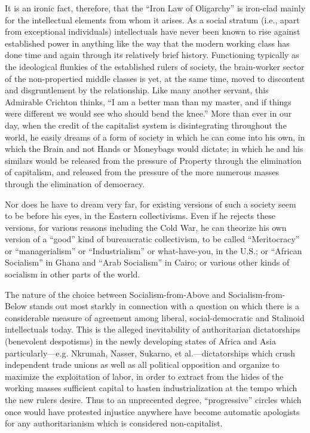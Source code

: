 It is an ironic fact, therefore, that the ``Iron Law of Oligarchy'' is iron-clad mainly for the intellectual elements from whom it arises. As a social stratum (i.e., apart from exceptional individuals) intellectuals have never been known to rise against established power in anything like the way that the modern working class has done time and again through its relatively brief history. Functioning typically as the ideological flunkies of the established rulers of society, the brain-worker sector of the non-propertied middle classes is yet, at the same time, moved to discontent and disgruntlement by the relationship. Like many another servant, this Admirable Crichton thinks, ``I am a better man than my master, and if things were different we would see who should bend the knee.'' More than ever in our day, when the credit of the capitalist system is disintegrating throughout the world, he easily dreams of a form of society in which he can come into his own, in which the Brain and not Hands or Moneybags would dictate; in which he and his similars would be released from the pressure of Property through the elimination of capitalism, and released from the pressure of the more numerous masses through the elimination of democracy.

Nor does he have to dream very far, for existing versions of such a society seem to be before his eyes, in the Eastern collectivisms. Even if he rejects these versions, for various reasons including the Cold War, he can theorize his own version of a ``good'' kind of bureaucratic collectivism, to be called ``Meritocracy'' or ``managerialism'' or ``Industrialism'' or what-have-you, in the U.S.; or ``African Socialism'' in Ghana and ``Arab Socialism'' in Cairo; or various other kinds of socialism in other parts of the world.

The nature of the choice between Socialism-from-Above and Socialism-from-Below stands out most starkly in connection with a question on which there is a considerable measure of agreement among liberal, social-democratic and Stalinoid intellectuals today. This is the alleged inevitability of authoritarian dictatorships (benevolent despotisms) in the newly developing states of Africa and Asia particularly---e.g. Nkrumah, Nasser, Sukarno, et al.---dictatorships which crush independent trade unions as well as all political opposition and organize to maximize the exploitation of labor, in order to extract from the hides of the working masses sufficient capital to hasten industrialization at the tempo which the new rulers desire. Thus to an unprecented degree, ``progressive'' circles which once would have protested injustice anywhere have become automatic apologists for any authoritarianism which is considered non-capitalist.

